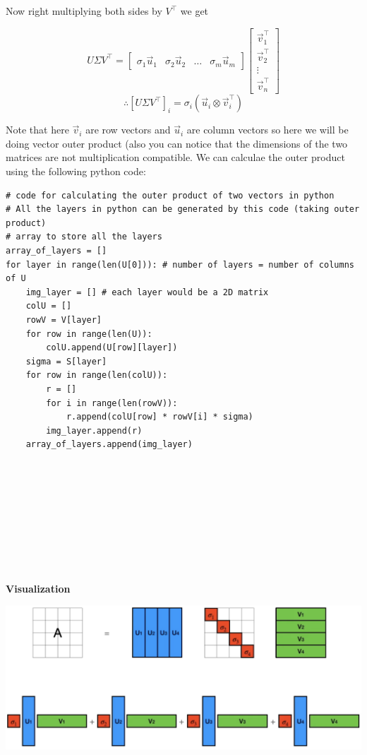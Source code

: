 \documentclass{article}
\begin{document}
Now right multiplying both sides by $V^{\top}$ we get

$$
U\Sigma V^{\top} = \begin{bmatrix} \sigma_{1} \vec{u}_{1} & \sigma_{2} \vec{u}_{2} & \dots & \sigma_{m} \vec{u}_{m} \end{bmatrix}
\begin{bmatrix}
    \vec{v}_{1}^{\top} \\
    \vec{v}_{2}^{\top} \\
    \vdots \\
    \vec{v}_{n}^{\top}
\end{bmatrix}
$$
$$
\therefore [U\Sigma V^{\top}]_{i} = \sigma_{i} (\vec{u}_{i} \otimes \vec{v}^{\top}_{i})
$$

Note that here $\vec{v}_{i}$ are row vectors and $\vec{u}_{i}$ are column vectors so here we will be doing vector outer product (also you can notice that the dimensions of the two matrices are not multiplication compatible. We can calculae the outer product using the following python code:

\begin{verbatim}
# code for calculating the outer product of two vectors in python
# All the layers in python can be generated by this code (taking outer product)
# array to store all the layers
array_of_layers = []
for layer in range(len(U[0])): # number of layers = number of columns of U
    img_layer = [] # each layer would be a 2D matrix
    colU = []
    rowV = V[layer]
    for row in range(len(U)):
        colU.append(U[row][layer])
    sigma = S[layer]
    for row in range(len(colU)):
        r = []
        for i in range(len(rowV)):
            r.append(colU[row] * rowV[i] * sigma)
        img_layer.append(r)
    array_of_layers.append(img_layer)

\end{verbatim}
\\ \\ \\ \\ \\ \\ \\ \\
\begin{center}
    \textbf{\large Visualization}
\end{center}

\vspace{0.5cm}

\includegraphics[width=16.5cm]{SVD_visualization.png}
\end{document}
